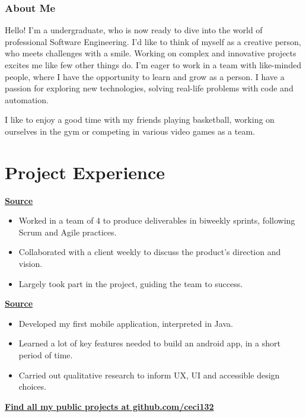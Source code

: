 \documentclass[]{resume}
\begin{document}
\begin{minipage}[t]{0.64\textwidth} 
\subsubsection{About Me} \hfill 

Hello! I'm a undergraduate, who is now ready to dive into the world of professional Software Engineering. I'd like to think of myself as a creative person, who meets challenges with a smile. Working on complex and innovative projects excites me like few other things do. I'm eager to work in a team with like-minded people, where I have the opportunity to learn and grow as a person. I have a passion for exploring new technologies, solving real-life problems with code and automation.

I like to enjoy a good time with my friends playing basketball, working on ourselves in the gym or competing in various video games as a team.
\sectionsep

\section{Project Experience}
\vspace{\topsep}
\begin{flatitems}
\item[] \hfill \href{https://github.com/TU-Project/PTS-project}{\bf Source}
    \begin{itemize}[leftmargin=*]
        \item Worked in a team of 4 to produce deliverables in biweekly sprints, following Scrum and Agile practices.
        \item Collaborated with a client weekly to discuss the product's direction and vision.
        \item Largely took part in the project, guiding the team to success.
    \end{itemize}
\item[] \hfill \href{https://github.com/ceci132/MountainPeaksQuiz}{\bf Source}
    \begin{itemize}[leftmargin=*]
        \item Developed my first mobile application, interpreted in Java.
        \item Learned a lot of key features needed to build an android app, in a short period of time.
        \item Carried out qualitative research to inform UX, UI and accessible design choices.
    \end{itemize}
\end{flatitems}
\sectionsep
\hfill \href{https://github.com/ceci132}{\bf Find all my public projects at github.com/ceci132}
\end{minipage} 
\end{document}
